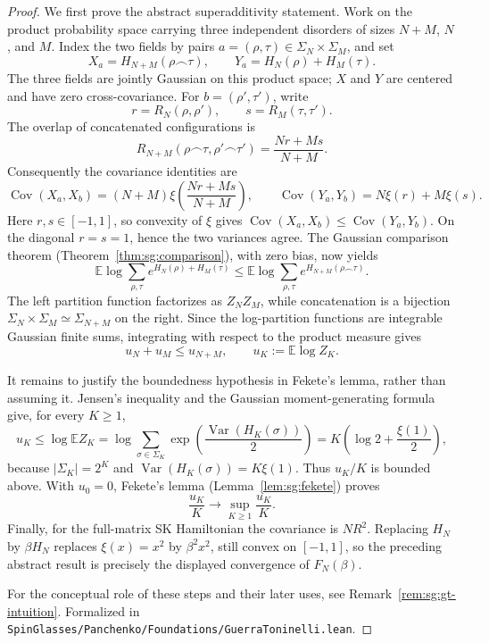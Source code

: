 \begin{proof}
  \leanok
We first prove the abstract superadditivity statement.  Work on the product probability space carrying three independent disorders of sizes $N+M$, $N$, and $M$.  Index the two fields by pairs $a=(\rho,\tau)\in\Sigma_N\times\Sigma_M$, and set
\[
 X_a=H_{N+M}(\rho\frown\tau),\qquad
 Y_a=H_N(\rho)+H_M(\tau).
\]
The three fields are jointly Gaussian on this product space; $X$ and $Y$ are centered and have zero cross-covariance.  For $b=(\rho',\tau')$, write
\[
 r=R_N(\rho,\rho'),\qquad s=R_M(\tau,\tau').
\]
The overlap of concatenated configurations is
\[
 R_{N+M}(\rho\frown\tau,\rho'\frown\tau')=
 \frac{Nr+Ms}{N+M}.
\]
Consequently the covariance identities are
\[
 \operatorname{Cov}(X_a,X_b)=(N+M)\xi\!\left(\frac{Nr+Ms}{N+M}\right),
 \qquad
 \operatorname{Cov}(Y_a,Y_b)=N\xi(r)+M\xi(s).
\]
Here $r,s\in[-1,1]$, so convexity of $\xi$ gives $\operatorname{Cov}(X_a,X_b)\leq\operatorname{Cov}(Y_a,Y_b)$.  On the diagonal $r=s=1$, hence the two variances agree.  The Gaussian comparison theorem (Theorem~\ref{thm:sg:comparison}), with zero bias, now yields
\[
 \mathbb E\log\sum_{\rho,\tau}e^{H_N(\rho)+H_M(\tau)}
 \leq
 \mathbb E\log\sum_{\rho,\tau}e^{H_{N+M}(\rho\frown\tau)}.
\]
The left partition function factorizes as $Z_NZ_M$, while concatenation is a bijection
$\Sigma_N\times\Sigma_M\simeq\Sigma_{N+M}$ on the right.  Since the log-partition functions are integrable Gaussian finite sums, integrating with respect to the product measure gives
\[
 u_N+u_M\leq u_{N+M},\qquad u_K:=\mathbb E\log Z_K.
\]

It remains to justify the boundedness hypothesis in Fekete's lemma, rather than assuming it.  Jensen's inequality and the Gaussian moment-generating formula give, for every $K\geq1$,
\[
 u_K\leq \log\mathbb E Z_K
 =\log\sum_{\sigma\in\Sigma_K}\exp\!\left(\frac{\operatorname{Var}(H_K(\sigma))}{2}\right)
 =K\left(\log2+\frac{\xi(1)}2\right),
\]
because $|\Sigma_K|=2^K$ and $\operatorname{Var}(H_K(\sigma))=K\xi(1)$.  Thus $u_K/K$ is bounded above.  With $u_0=0$, Fekete's lemma (Lemma~\ref{lem:sg:fekete}) proves
\[
 \frac{u_K}{K}\longrightarrow\sup_{K\geq1}\frac{u_K}{K}.
\]
Finally, for the full-matrix SK Hamiltonian the covariance is $N R^2$.  Replacing $H_N$ by $\beta H_N$ replaces $\xi(x)=x^2$ by $\beta^2x^2$, still convex on $[-1,1]$, so the preceding abstract result is precisely the displayed convergence of $F_N(\beta)$.

For the conceptual role of these steps and their later uses, see Remark~\ref{rem:sg:gt-intuition}.
Formalized in \texttt{SpinGlasses/Panchenko/Foundations/GuerraToninelli.lean}.
\end{proof}

